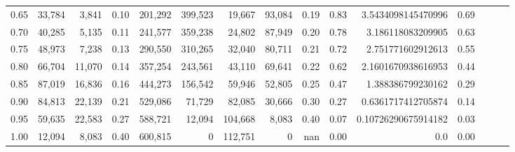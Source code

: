 \begin{tabular}{rrrrrrrrrrrrrrr}
0.65 &  33,784 &   3,841 &  0.10 &  201,292 &  399,523 &   19,667 &   93,084 &  0.19 &  0.83 &   3.5434098145470996 &      0.69 \\
0.70 &  40,285 &   5,135 &  0.11 &  241,577 &  359,238 &   24,802 &   87,949 &  0.20 &  0.78 &    3.186118083209905 &      0.63 \\
0.75 &  48,973 &   7,238 &  0.13 &  290,550 &  310,265 &   32,040 &   80,711 &  0.21 &  0.72 &    2.751771602912613 &      0.55 \\
0.80 &  66,704 &  11,070 &  0.14 &  357,254 &  243,561 &   43,110 &   69,641 &  0.22 &  0.62 &   2.1601670938616953 &      0.44 \\
0.85 &  87,019 &  16,836 &  0.16 &  444,273 &  156,542 &   59,946 &   52,805 &  0.25 &  0.47 &    1.388386799230162 &      0.29 \\
0.90 &  84,813 &  22,139 &  0.21 &  529,086 &   71,729 &   82,085 &   30,666 &  0.30 &  0.27 &   0.6361717412705874 &      0.14 \\
0.95 &  59,635 &  22,583 &  0.27 &  588,721 &   12,094 &  104,668 &    8,083 &  0.40 &  0.07 &  0.10726290675914182 &      0.03 \\
1.00 &  12,094 &   8,083 &  0.40 &  600,815 &        0 &  112,751 &        0 &   nan &  0.00 &                  0.0 &      0.00 \\
\bottomrule
\end{tabular}
